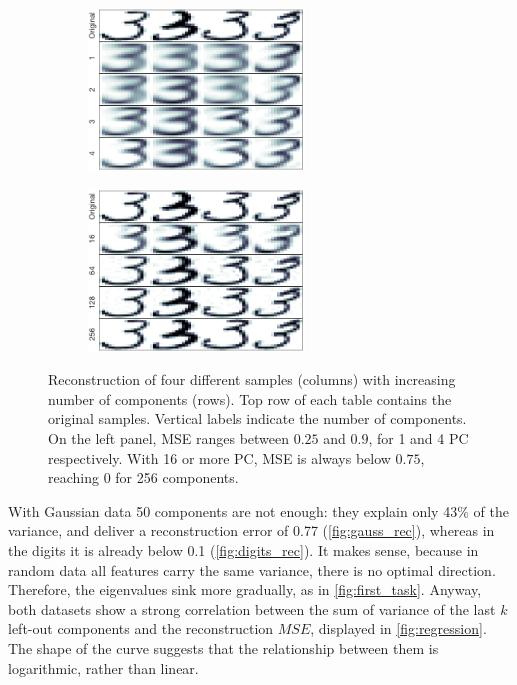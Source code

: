 \documentclass[a4paper, 10pt]{article}
\begin{document}
  \begin{figure}[h]
    \centering
    \hfill
    \begin{subfigure}[t]{0.4\linewidth}
      \includegraphics[width=\linewidth, height=4.3cm]{./lab3/PCA/mosaics/PC_1_4_small.png}
      \label{fig:few_pc}
    \end{subfigure}
    \hfill
    \begin{subfigure}[t]{0.4\linewidth}
      \includegraphics[width=\linewidth,height=4.3cm]{./lab3/PCA/mosaics/PC_16_256_small.png}
      \label{fig:many_pc}
    \end{subfigure}
    \hfill \mbox{}
    \caption{Reconstruction of four different samples (columns) with increasing
      number of components (rows). Top row of each table contains the 
    original samples. Vertical labels indicate the number of components. On the
    left panel, MSE ranges between $0.25$ and $0.9$, for 1 and 4 PC respectively.
  With 16 or more PC, MSE is always below $0.75$, reaching $0$ for 256 components.}
    \label{fig:threes_pc}
  \end{figure}

  With Gaussian data 50 components are not enough: they explain only 43\% of the 
  variance, and deliver a reconstruction error of 0.77 (\autoref{fig:gauss_rec}),
  whereas in the digits it is already below 0.1 (\autoref{fig:digits_rec}). 
  It makes sense, because in random data all features carry the same variance, 
  there is no optimal direction.  Therefore, the eigenvalues sink more gradually,
  as in \autoref{fig:first_task}.  Anyway, both datasets show a strong 
  correlation between the sum of variance of the last $k$ left-out components 
  and the reconstruction $MSE$, displayed in \autoref{fig:regression}. The shape
  of the curve suggests that the relationship between them is logarithmic, 
  rather than linear.
\end{document}
